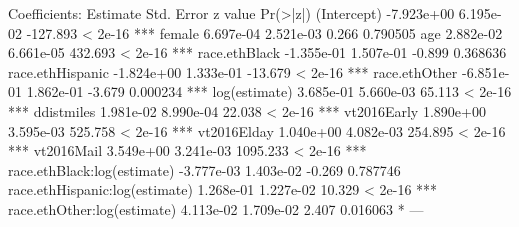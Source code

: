 Coefficients:
                                 Estimate Std. Error  z value Pr(>|z|)    
(Intercept)                    -7.923e+00  6.195e-02 -127.893  < 2e-16 ***
female                          6.697e-04  2.521e-03    0.266 0.790505    
age                             2.882e-02  6.661e-05  432.693  < 2e-16 ***
race.ethBlack                  -1.355e-01  1.507e-01   -0.899 0.368636    
race.ethHispanic               -1.824e+00  1.333e-01  -13.679  < 2e-16 ***
race.ethOther                  -6.851e-01  1.862e-01   -3.679 0.000234 ***
log(estimate)                   3.685e-01  5.660e-03   65.113  < 2e-16 ***
ddistmiles                      1.981e-02  8.990e-04   22.038  < 2e-16 ***
vt2016Early                     1.890e+00  3.595e-03  525.758  < 2e-16 ***
vt2016Elday                     1.040e+00  4.082e-03  254.895  < 2e-16 ***
vt2016Mail                      3.549e+00  3.241e-03 1095.233  < 2e-16 ***
race.ethBlack:log(estimate)    -3.777e-03  1.403e-02   -0.269 0.787746    
race.ethHispanic:log(estimate)  1.268e-01  1.227e-02   10.329  < 2e-16 ***
race.ethOther:log(estimate)     4.113e-02  1.709e-02    2.407 0.016063 *  
---